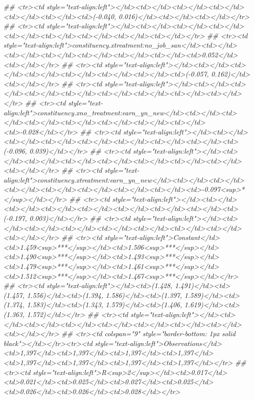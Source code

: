 \documentclass[
]{article}
\newenvironment{Shaded}{\begin{snugshade}}{\end{snugshade}}
\newcommand{\CommentTok}[1]{\textcolor[rgb]{0.56,0.35,0.01}{\textit{#1}}}
\begin{document}
\begin{Shaded}
\begin{Highlighting}[]
{{{{{{{{{{{{{{\CommentTok{## <tr><td style="text-align:left"></td><td></td><td></td><td></td><td></td><td></td><td>(-0.040, 0.016)</td><td></td><td></td></tr>}
\CommentTok{## <tr><td style="text-align:left"></td><td></td><td></td><td></td><td></td><td></td><td></td><td></td><td></td></tr>}
\CommentTok{## <tr><td style="text-align:left">constituency.xtreatment:no_job_san</td><td></td><td></td><td></td><td></td><td></td><td></td><td>0.052</td><td></td></tr>}
\CommentTok{## <tr><td style="text-align:left"></td><td></td><td></td><td></td><td></td><td></td><td></td><td>(-0.057, 0.162)</td><td></td></tr>}
\CommentTok{## <tr><td style="text-align:left"></td><td></td><td></td><td></td><td></td><td></td><td></td><td></td><td></td></tr>}
\CommentTok{## <tr><td style="text-align:left">constituency.xno_treatment:earn_yn_new</td><td></td><td></td><td></td><td></td><td></td><td></td><td></td><td>-0.028</td></tr>}
\CommentTok{## <tr><td style="text-align:left"></td><td></td><td></td><td></td><td></td><td></td><td></td><td></td><td>(-0.096, 0.039)</td></tr>}
\CommentTok{## <tr><td style="text-align:left"></td><td></td><td></td><td></td><td></td><td></td><td></td><td></td><td></td></tr>}
\CommentTok{## <tr><td style="text-align:left">constituency.xtreatment:earn_yn_new</td><td></td><td></td><td></td><td></td><td></td><td></td><td></td><td>-0.097<sup>*</sup></td></tr>}
\CommentTok{## <tr><td style="text-align:left"></td><td></td><td></td><td></td><td></td><td></td><td></td><td></td><td>(-0.197, 0.003)</td></tr>}
\CommentTok{## <tr><td style="text-align:left"></td><td></td><td></td><td></td><td></td><td></td><td></td><td></td><td></td></tr>}
\CommentTok{## <tr><td style="text-align:left">Constant</td><td>1.459<sup>***</sup></td><td>1.506<sup>***</sup></td><td>1.490<sup>***</sup></td><td>1.493<sup>***</sup></td><td>1.479<sup>***</sup></td><td>1.461<sup>***</sup></td><td>1.512<sup>***</sup></td><td>1.467<sup>***</sup></td></tr>}
\CommentTok{## <tr><td style="text-align:left"></td><td>(1.428, 1.491)</td><td>(1.457, 1.556)</td><td>(1.394, 1.586)</td><td>(1.397, 1.589)</td><td>(1.374, 1.583)</td><td>(1.343, 1.579)</td><td>(1.406, 1.619)</td><td>(1.363, 1.572)</td></tr>}
\CommentTok{## <tr><td style="text-align:left"></td><td></td><td></td><td></td><td></td><td></td><td></td><td></td><td></td></tr>}
\CommentTok{## <tr><td colspan="9" style="border-bottom: 1px solid black"></td></tr><tr><td style="text-align:left">Observations</td><td>1,397</td><td>1,397</td><td>1,397</td><td>1,397</td><td>1,397</td><td>1,397</td><td>1,397</td><td>1,397</td></tr>}
\CommentTok{## <tr><td style="text-align:left">R<sup>2</sup></td><td>0.017</td><td>0.021</td><td>0.025</td><td>0.027</td><td>0.025</td><td>0.026</td><td>0.026</td><td>0.028</td></tr>}
}}}}}}}}}}}}}}
\end{Highlighting}
\end{Shaded}
\end{document}
